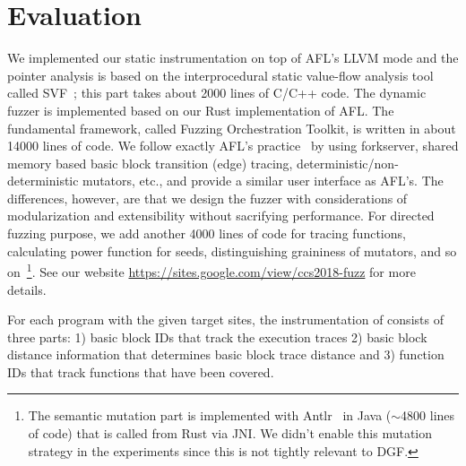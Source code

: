 %
 

\section{Evaluation}\label{sec:eval}

We implemented our static instrumentation on top of AFL's LLVM mode and the pointer analysis is based on the interprocedural static value-flow analysis tool called SVF~\cite{Sui:2016:SVF}; this part takes about 2000 lines of C/C++ code. The dynamic fuzzer is implemented based on our Rust implementation of AFL. The fundamental framework, called Fuzzing Orchestration Toolkit\cite{fse18-fot}, is written in about 14000 lines of code. We follow exactly AFL's practice~\cite{afl_detail} by using forkserver, shared memory based basic block transition (edge) tracing, deterministic/non-deterministic mutators, etc., and provide a similar user interface as AFL's. The differences, however, are that we design the fuzzer with considerations of modularization and extensibility without sacrifying performance. For directed fuzzing purpose, we add another 4000 lines of code for tracing functions, calculating power function for seeds, distinguishing graininess of mutators, and so on~\footnote{The semantic mutation part is implemented with Antlr~\cite{antlr} in Java ($\sim$4800 lines of code) that is called from Rust via JNI. We didn't enable this mutation strategy in the experiments since this is not tightly relevant to DGF.}. See our website \url{https://sites.google.com/view/ccs2018-fuzz} for more details.

For each program with the given target sites, the instrumentation of {\dFOT} consists of three parts: 1) basic block IDs that track the execution traces 2) basic block distance information that determines basic block trace distance and 3) function IDs that track functions that have been covered. 




